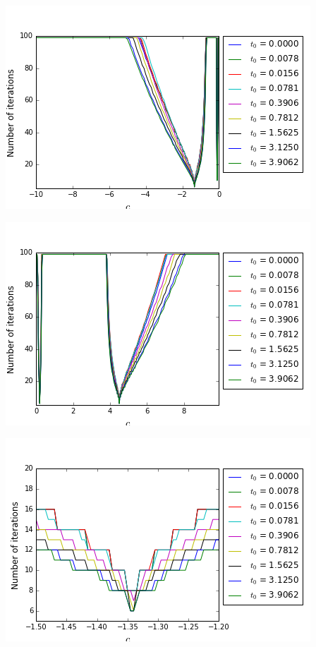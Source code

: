 \begingroup
\begin{minipage}{.5\linewidth}
\begin{center}
	\includegraphics[scale=.4]{figures/FinalFigures/NiterxCoefVarT0FinalVersionN.png}
\end{center}
\end{minipage}
\begin{minipage}{.5\linewidth}
\begin{center}
	\includegraphics[scale=.4]{figures/FinalFigures/NiterxCoefVarT0FinalVersionP.png}
\end{center}
\end{minipage}
\begin{minipage}{.5\linewidth}
\begin{center}
	\includegraphics[scale=.4]{figures/FinalFigures/NiterxCoefVarT0FinalVersionNDetail.png}
\end{center}
\end{minipage}
